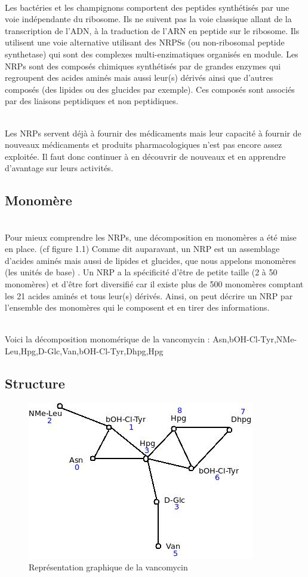 \documentclass[a4paper,10pt]{report}
\begin{document}
	
    
 	~\\ 
	Les bactéries et les champignons comportent des peptides synthétisés par une voie indépendante du ribosome. 
	Ils ne suivent pas la voie classique allant de la transcription de l'ADN, à la traduction de l'ARN en peptide sur le ribosome.
	Ils utilisent une voie alternative utilisant des NRPSs (ou non-ribosomal peptide synthetase) qui sont des complexes multi-enzimatiques organisés en module.
	Les NRPs sont des composés chimiques synthétisés par de grandes enzymes qui regroupent des acides aminés mais aussi leur(s) dérivés ainsi que d'autres composés (des lipides ou des glucides par exemple). Ces composés sont associés par des liaisons peptidiques et non peptidiques. 
	
	\\Les NRPs servent déjà à fournir des médicaments mais leur capacité à fournir de nouveaux médicaments et produits pharmacologiques n'est pas encore assez exploitée. Il faut donc continuer à en découvrir de nouveaux et en apprendre d'avantage sur leurs activités.

      \subsection{Monomère}
	
	~~\\Pour mieux comprendre les NRPs, une décomposition en monomères a été mise en place. (cf figure 1.1) 
	Comme dit auparavant, un NRP est un assemblage d'acides aminés mais aussi de lipides et glucides, que nous  appelons monomères (les unités de base) . 
	Un NRP a la spécificité d'être de petite taille (2 à 50 monomères) et d'être fort diversifié car il existe plus de 500 monomères comptant les 21 acides aminés et tous leur(s) dérivés.
	Ainsi, on peut décrire un NRP par l'ensemble des monomères qui le composent et en tirer des informations. 
	
	\\Voici la décomposition monomérique de la vancomycin : Asn,bOH-Cl-Tyr,NMe-Leu,Hpg,D-Glc,Van,bOH-Cl-Tyr,Dhpg,Hpg
	
      \subsection{Structure}
	

	\begin{figure}[h]
	    \includegraphics[scale = 0.5]{image/vanco_mono.jpeg}
	    \caption{Représentation graphique de la vancomycin }
	\end{figure}
	
\end{document}
